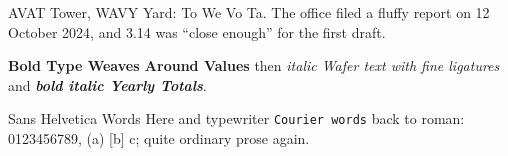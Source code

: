 \documentclass{article}
\begin{document}
AVAT Tower, WAVY Yard: To We Vo Ta. The office filed a fluffy report
on 12 October 2024, and 3.14 was ``close enough'' for the first draft.

\textbf{Bold Type Weaves Around Values} then \textit{italic Wafer text
with fine ligatures} and \textbf{\textit{bold italic Yearly Totals}}.

Sans \textsf{Helvetica Words Here} and typewriter \texttt{Courier words}
back to roman: 0123456789, (a) [b] c; quite ordinary prose again.
\end{document}
